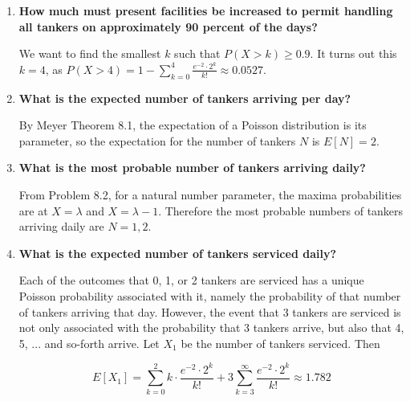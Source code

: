 \documentclass[10pt, oneside]{article}
\begin{document}
\begin{enumerate}[label=8.\arabic*]
\begin{enumerate}
	\item  \begin{tcolorbox}[
	  colback=Cerulean!5!white,
	  colframe=Cerulean!75!black]
	\textbf{How much must present facilities be increased to permit handling all tankers on approximately 90 percent of the days?}
	\end{tcolorbox}
	
	We want to find the smallest $k$ such that $P(X > k) \geq 0.9$. It turns out this $\boxed{k = 4}$, as $P(X > 4) = 1 - \sum^4_{k = 0} \frac{e^{-2} \cdot 2^k }{k!} \approx 0.0527$.
	
	\item  \begin{tcolorbox}[
	  colback=Cerulean!5!white,
	  colframe=Cerulean!75!black]
	\textbf{What is the expected number of tankers arriving per day?}
	\end{tcolorbox}
	
	By Meyer Theorem 8.1, the expectation of a Poisson distribution is its parameter, so the expectation for the number of tankers $N$ is $\boxed{E[N] = 2}$.
	
	\item  \begin{tcolorbox}[
	  colback=Cerulean!5!white,
	  colframe=Cerulean!75!black]
	\textbf{What is the most probable number of tankers arriving daily?}
	\end{tcolorbox}
	
	From Problem 8.2, for a natural number parameter, the maxima probabilities are at $X = \lambda$ and $X = \lambda - 1$. Therefore the most probable numbers of tankers arriving daily are $\boxed{N = 1, 2}$.
	
	\item  \begin{tcolorbox}[
	  colback=Cerulean!5!white,
	  colframe=Cerulean!75!black]
	\textbf{What is the expected number of tankers serviced daily?}
	\end{tcolorbox}
	
	Each of the outcomes that 0, 1, or 2 tankers are serviced has a unique Poisson probability associated with it, namely the probability of that number of tankers arriving that day. However, the event that 3 tankers are serviced is not only associated with the probability that 3 tankers arrive, but also that 4, 5, ... and so-forth arrive. Let $X_1$ be the number of tankers serviced. Then
	
	\[ E[X_1] = \sum^2_{k = 0} k \cdot \frac{e^{-2} \cdot 2^k}{k!} + 3 \sum^{\infty}_{k = 3} \frac{e^{-2} \cdot 2^k}{k!} \approx \boxed{1.782} \]
	

\end{enumerate}
\end{enumerate}
\end{document}
